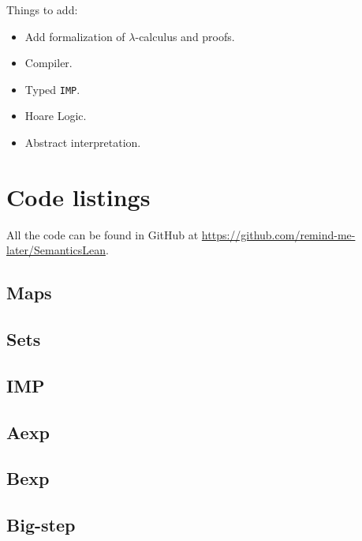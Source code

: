 \documentclass[
  a4paper, 
  10pt, 
  parskip=half, 
  DIV=20,
  toc=bibliography,
  usegeometry,
]{scrartcl}
\begin{document}
Things to add:

\begin{itemize}
  \item Add formalization of \(\lambda\)-calculus and proofs.
  \item Compiler.
  \item Typed \texttt{IMP}.
  \item Hoare Logic.
  \item Abstract interpretation.
\end{itemize}

\section{Code listings}

All the code can be found in GitHub at \url{
  https://github.com/remind-me-later/SemanticsLean}.

\subsection{Maps}



\subsection{Sets}



\subsection{IMP}



\subsection{Aexp}



\subsection{Bexp}



\subsection{Big-step}
\end{document}
